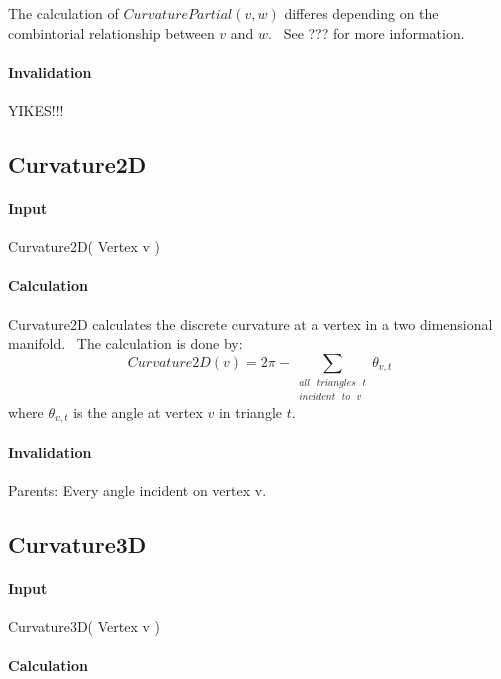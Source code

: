 The calculation of $CurvaturePartial(v,w)$ differes depending on the
combintorial relationship between $v$ and $w$. \ See ??? for more
information.

\paragraph{Invalidation}

YIKES!!!

\subsection{Curvature2D}

\paragraph{Input}

Curvature2D( Vertex v )

\paragraph{Calculation}

Curvature2D calculates the discrete curvature at a vertex in a two
dimensional manifold. \ The calculation is done by:%
\begin{equation*}
Curvature2D\left( v\right) =2\pi -\sum\limits_{\substack{ all\text{ }%
triangles\text{ }t  \\ incident\text{ }to\text{ }v}}\theta _{v,t}
\end{equation*}%
where $\theta _{v,t}$ is the angle at vertex $v$ in triangle $t$. \ 

\paragraph{Invalidation}

\bigskip Parents: Every angle incident on vertex v.

\subsection{Curvature3D}

\paragraph{Input}

Curvature3D( Vertex v )

\paragraph{Calculation}

